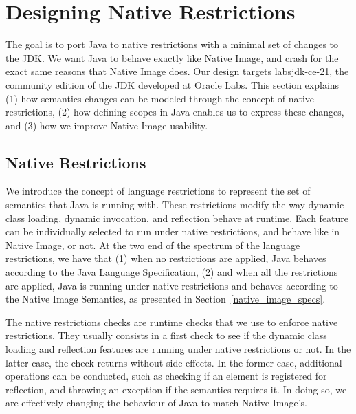 \chapter{Designing Native Restrictions}

The goal is to port Java to native restrictions with a minimal set of changes to the JDK. We want Java to behave exactly like Native Image, and crash for the exact same reasons that Native Image does. Our design targets labsjdk-ce-21, the community edition of the JDK developed at Oracle Labs. 
This section explains (1) how semantics changes can be modeled through the concept of native restrictions, (2) how defining scopes in Java enables us to express these changes, and (3) how we improve Native Image usability.

\section{Native Restrictions}
We introduce the concept of language restrictions to represent the set of semantics that Java is running with. These restrictions modify the way dynamic class loading, dynamic invocation, and reflection behave at runtime. Each feature can be individually selected to run under native restrictions, and behave like in Native Image, or not.
At the two end of the spectrum of the language restrictions, we have that (1) when no restrictions are applied, Java behaves according to the Java Language Specification, (2) and when all the restrictions are applied, Java is running under native restrictions and behaves according to the Native Image Semantics, as presented in Section~\ref{native_image_specs}. 

The native restrictions checks are runtime checks that we use to enforce native restrictions. They usually consists in a first check to see if the dynamic class loading and reflection features are running under native restrictions or not. In the latter case, the check returns without side effects. In the former case, additional operations can be conducted, such as checking if an element is registered for reflection, and throwing an exception if the semantics requires it. In doing so, we are effectively changing the behaviour of Java to match Native Image's.

